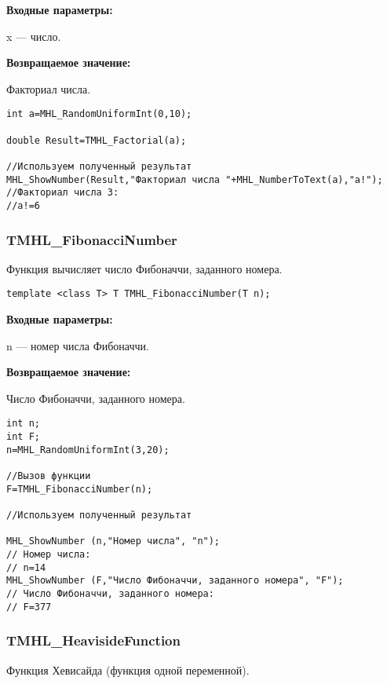 \documentclass[a4paper,12pt]{article}
\begin{document}
\textbf{Входные параметры:}  
 
 x --- число.

\textbf{Возвращаемое значение:}

 Факториал числа.


\begin{lstlisting}[label=code_use_TMHL_Factorial,caption=Пример использования]
int a=MHL_RandomUniformInt(0,10);

double Result=TMHL_Factorial(a);

//Используем полученный результат
MHL_ShowNumber(Result,"Факториал числа "+MHL_NumberToText(a),"a!");
//Факториал числа 3:
//a!=6
\end{lstlisting}

\subsubsection{TMHL\_FibonacciNumber}\label{TMHL_FibonacciNumber}

Функция вычисляет число Фибоначчи, заданного номера.


\begin{lstlisting}[label=code_syntax_TMHL_FibonacciNumber,caption=Синтаксис]
template <class T> T TMHL_FibonacciNumber(T n);
\end{lstlisting}

\textbf{Входные параметры:}  
 
 n --- номер числа Фибоначчи.

\textbf{Возвращаемое значение:}
 
 Число Фибоначчи, заданного номера.


\begin{lstlisting}[label=code_use_TMHL_FibonacciNumber,caption=Пример использования]
int n;
int F;
n=MHL_RandomUniformInt(3,20);

//Вызов функции
F=TMHL_FibonacciNumber(n);

//Используем полученный результат

MHL_ShowNumber (n,"Номер числа", "n");
// Номер числа:
// n=14
MHL_ShowNumber (F,"Число Фибоначчи, заданного номера", "F");
// Число Фибоначчи, заданного номера:
// F=377
\end{lstlisting}

\subsubsection{TMHL\_HeavisideFunction}\label{TMHL_HeavisideFunction}

Функция Хевисайда (функция одной переменной).
\end{document}
